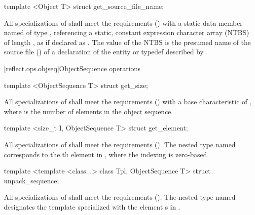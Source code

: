 \begin{std.txt}
\begin{itemdecl}
template <Object T> struct get_source_file_name;
\end{itemdecl}

\begin{itemdescr}
\pnum
All specializations of  shall meet the  requirements () with a static data member named  of type , referencing a static, constant expression character array (NTBS) of length , as if declared as . The value of the NTBS is the presumed name of the source file () of a declaration of the entity or typedef described by .

\end{itemdescr}

\end{std.txt}

[reflect.ops.objseq]{ObjectSequence operations}

\begin{std.txt}\color{addclr}

\begin{itemdecl}
template <ObjectSequence T> struct get_size;
\end{itemdecl}

\begin{itemdescr}
\pnum
All specializations of  shall meet the  requirements () with a base characteristic of , where  is the number of elements in the object sequence.
\end{itemdescr}

\begin{itemdecl}
template <size_t I, ObjectSequence T> struct get_element;
\end{itemdecl}

\begin{itemdescr}
\pnum
All specializations of  shall meet the  requirements (). The nested type named  corresponds to the th element  in , where the indexing is zero-based.
\end{itemdescr}

\begin{itemdecl}
template <template <class...> class Tpl, ObjectSequence T> struct unpack_sequence;
\end{itemdecl}

\begin{itemdescr}
\pnum
All specializations of  shall meet the  requirements (). The nested type named  designates the template  specialized with the element s in .
\end{itemdescr}
\end{std.txt}

